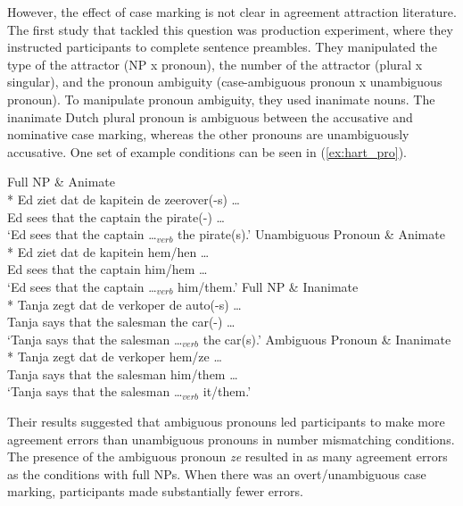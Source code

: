 However, the effect of case marking is not clear in agreement attraction literature. The first study that tackled this question was \cites{HatsuikerEtAl2001} production experiment, where they instructed participants to complete sentence preambles. They manipulated the type of the attractor (NP x pronoun), the number of the attractor (plural x singular), and the pronoun ambiguity (case-ambiguous pronoun x unambiguous pronoun). To manipulate pronoun ambiguity, they used inanimate nouns. The inanimate Dutch plural pronoun is ambiguous between the accusative and nominative case marking, whereas the other pronouns are unambiguously accusative. One set of example conditions can be seen in (\ref{ex:hart_pro}). 

\ea \label{ex:hart_pro}
  \ea \label{ex:hart_pro_npunamb} {Full NP \& Animate}\\*
    \gll Ed ziet dat de {kapitein} de {zeerover(-s)} \ldots{} \\
    Ed sees that the captain the pirate(-\Pl{}) \ldots{} \\
    \glt `Ed sees that the captain \ldots{}$_{verb}$ the pirate(s).'
  \ex \label{ex:hart_pro_prounamb} {Unambiguous Pronoun \& Animate}\\*
    \gll Ed ziet dat de {kapitein} {hem/hen} \ldots{} \\
    Ed sees that the captain him/hem \ldots{} \\
    \glt `Ed sees that the captain \ldots{}$_{verb}$ him/them.'
  \ex \label{ex:hart_pro_npamb} {Full NP \& Inanimate}\\*
    \gll Tanja zegt dat de {verkoper} de {auto(-s)} \ldots{} \\
    Tanja says that the salesman the car(-\Pl{}) \ldots{} \\
    \glt `Tanja says that the salesman \ldots{}$_{verb}$ the car(s).'
  \ex \label{ex:hart_pro_proamb} {Ambiguous Pronoun \& Inanimate}\\*
    \gll Tanja zegt dat de {verkoper} {hem/ze} \ldots{} \\
    Tanja says that the salesman  him/them \ldots{} \\
    \glt `Tanja says that the salesman \ldots{}$_{verb}$ it/them.'
  \z
\z

Their results suggested that ambiguous pronouns led participants to make more agreement errors than unambiguous pronouns in number mismatching conditions. The presence of the ambiguous pronoun \emph{ze} resulted in as many agreement errors as the conditions with full NPs. When there was an overt/unambiguous case marking, participants made substantially fewer errors. 

